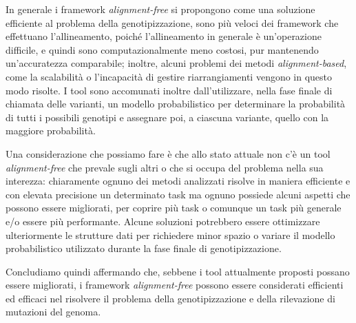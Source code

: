 \documentclass[../main.tex]{subfiles}
\begin{document}
In generale i framework \textit{alignment-free} si propongono come una soluzione efficiente al problema della genotipizzazione, sono più veloci dei framework che effettuano l'allineamento, poiché l'allineamento in generale è un'operazione difficile, e quindi sono computazionalmente meno costosi, pur mantenendo un'accuratezza comparabile; inoltre, alcuni problemi dei metodi \textit{alignment-based}, come la scalabilità o l'incapacità di gestire riarrangiamenti vengono in questo modo risolte. I tool sono accomunati inoltre dall'utilizzare, nella fase finale di chiamata delle varianti, un modello probabilistico per determinare la probabilità di tutti i possibili genotipi e assegnare poi, a ciascuna variante, quello con la maggiore probabilità.

Una considerazione che possiamo fare è che allo stato attuale non c'è un tool \textit{alignment-free} che prevale sugli altri o che si occupa del problema nella sua interezza: chiaramente ognuno dei metodi analizzati risolve in maniera efficiente e con elevata precisione un determinato task ma ognuno possiede alcuni aspetti che possono essere migliorati, per coprire più task o comunque un task più generale e/o essere più performante. Alcune soluzioni potrebbero essere ottimizzare ulteriormente le strutture dati per richiedere minor spazio o variare il modello probabilistico utilizzato durante la fase finale di genotipizzazione.

Concludiamo quindi affermando che, sebbene i tool attualmente proposti possano essere migliorati, i framework \textit{alignment-free} possono essere considerati efficienti ed efficaci nel risolvere il problema della genotipizzazione e della rilevazione di mutazioni del genoma. 
\end{document}
